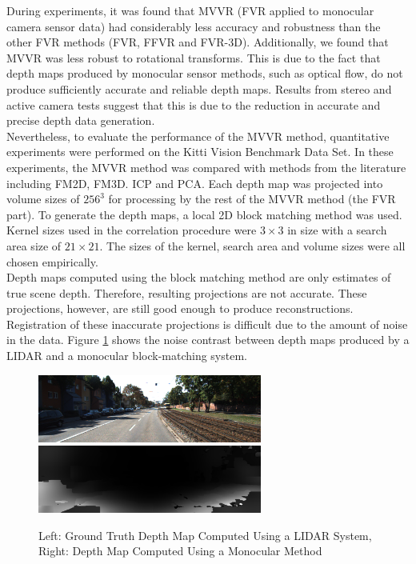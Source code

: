 
During experiments, it was found that MVVR (FVR applied to monocular camera sensor data) had considerably less accuracy and robustness than the other FVR methods (FVR, FFVR and FVR-3D). Additionally, we found that MVVR was less robust to rotational transforms. This is due to the fact that depth maps produced by monocular sensor methods, such as optical flow, do not produce sufficiently accurate and reliable depth maps. Results from stereo and active camera tests suggest that this is due to the reduction in accurate and precise depth data generation. \\

Nevertheless, to evaluate the performance of the MVVR method, quantitative experiments were performed on the Kitti Vision Benchmark Data Set. In these experiments, the MVVR method was compared with methods from the literature including FM2D, FM3D. ICP and PCA. Each depth map was projected into volume sizes of $256^3$ for processing by the rest of the MVVR method (the FVR part). To generate the depth maps, a local 2D block matching method was used. Kernel sizes used in the correlation procedure were $3 \times 3$ in size with a search area size of $21 \times 21$. The sizes of the kernel, search area and volume sizes were all chosen empirically. \\

Depth maps computed using the block matching method are only estimates of true scene depth. Therefore, resulting projections are not accurate. These projections, however, are still good enough to produce reconstructions. Registration of these inaccurate projections is difficult due to the amount of noise in the data. Figure \ref{fig:lidarVSMono} shows the noise contrast between depth maps produced by a LIDAR and a monocular block-matching system. \\

\begin{figure}[!htb]
\centering
\includegraphics[width=2.9in]{images/methodology/FVR/mono/color}
\includegraphics[width=2.9in]{images/methodology/FVR/mono/depth}
\caption{Left: Ground Truth Depth Map Computed Using a LIDAR System, Right: Depth Map Computed Using a Monocular Method}
\label{fig:lidarVSMono}
\end{figure}



